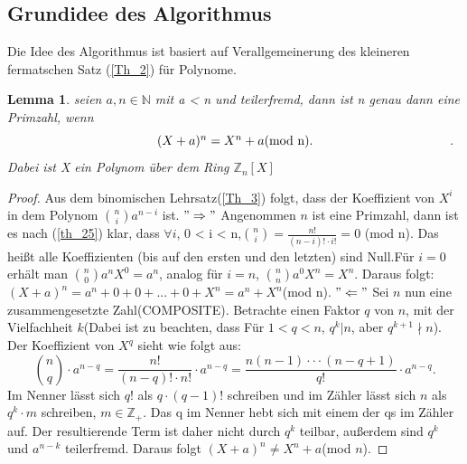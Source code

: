 \documentclass[12pt,oneside]{article}
\newtheorem{lemma}[theorem]{Lemma}
\theoremstyle{remark}
\theoremstyle{definition}
\begin{document}
\subsection{Grundidee des Algorithmus}
Die Idee des Algorithmus ist basiert auf  Verallgemeinerung des kleineren fermatschen Satz (\ref{Th_2}) für Polynome.
\begin{flushleft}
\begin{lemma}\label{hauptlemma}
seien $a,n \in \mathbb{N}$ mit a < n und teilerfremd, dann ist n genau dann eine Primzahl, wenn \newline
\begin{equation}\label{eq:1}
\centerline{ $(X + a)^n = X^n +a $(mod n).}.
\end{equation}\newline
Dabei ist X ein Polynom über dem Ring $\mathbb{Z}_{n}[X]$
\end{lemma}
\begin{proof}
Aus dem binomischen Lehrsatz(\ref{Th_3}) folgt, dass der Koeffizient von $X^i$ in dem Polynom ${n \choose i} a^{n-i}$ ist.\newline\newline
$"\Rightarrow"$\newline
Angenommen $n$ ist eine Primzahl, dann ist es nach (\ref{th_25}) klar, dass $\forall i $, 0 < i < n,\newline\smallskip ${n \choose i} = \frac{n!}{(n-i)! \cdot i!} = 0 $ (mod n). Das heißt alle Koeffizienten (bis auf den ersten und den letzten) sind Null.\newline\newline Für $i = 0$ erhält man  ${n \choose 0} a^n X^0 = a^n$, analog für $i = n$, ${n \choose n} a^0 X^n = X^n$. Daraus folgt:
$(X + a)^n = a^n + 0 + 0 + ... + 0 + X^n = a^n + X^n$(mod n).\newline\newline
$"\Leftarrow"$\newline
Sei $n$ nun eine zusammengesetzte Zahl(COMPOSITE). Betrachte einen Faktor $q$ von $n$, mit der Vielfachheit $k$(Dabei ist zu beachten, dass Für $1 < q < n$, $q^k | n$, aber $q^{k+1} \nmid n$).\newline
Der Koeffizient von $X^q$ sieht wie folgt aus:\newline\smallskip
\begin{equation}
    {n \choose q} \cdot a^{n-q} = \frac{n!}{(n-q)! \cdot n!} \cdot a^{n-q} = \frac{n(n-1)\cdot \cdot \cdot (n-q+1)}{q!} \cdot a^{n-q}.
\end{equation}
\newline\newline
Im Nenner lässt sich $q!$ als $q \cdot (q-1)!$ schreiben und im Zähler lässt sich $n$ als $q^k\cdot m$ schreiben, $m \in \mathbb{Z}_{+}$. Das q im Nenner hebt sich mit einem der qs im Zähler auf. Der resultierende Term ist daher nicht durch $q^k$ teilbar, außerdem sind $q^k$ und $a^{n-k}$ teilerfremd. Daraus folgt $(X + a)^n \neq X^n + a $(mod $n$).
\end{proof}


\end{flushleft}
\end{document}
